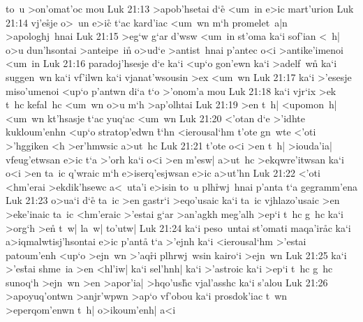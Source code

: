 to~u
>on'omat'oc
mou\bibvsend
\vs Luk 21:13
>apob'hsetai
d`e\r{}
<um~in
e>ic
mart'urion\bibvsend
\vs Luk 21:14
vj'e\r{s}je
o>~un
e>ic\r{}
t`ac
kard'iac
<um~wn
m`h
promelet~a|n
>apologhj~hnai\bibvsend
\vs Luk 21:15
>eg`w
g`ar
d'wsw
<um~in
st'oma
ka`i
sof'ian
<~h|
o>u
dun'hsontai
>anteipe~in\r{}
o>ud`e
>antist~hnai
p'antec
o<i
>antike'imenoi
<um~in\bibvsend
\vs Luk 21:16
paradoj'hsesje
d`e
ka`i
<up`o
gon'ewn
ka`i
>adelf~wn\r{}
ka`i
suggen~wn
ka`i
vf'ilwn
ka`i
vjanat'wsousin
>ex
<um~wn\bibvsend
\vs Luk 21:17
ka`i
>'esesje
miso'umenoi
<up`o
p'antwn
di`a
t`o
>'onom'a
mou\bibvsend
\vs Luk 21:18
ka`i
vjr`ix
>ek
t~hc
kefal~hc
<um~wn
o>u
m`h
>ap'olhtai\bibvsend
\vs Luk 21:19
>en
t~h|
<upomon~h|
<um~wn
kt'hsasje
t`ac
yuq`ac
<um~wn\bibvsend
\vs Luk 21:20
<'otan
d`e
>'idhte
kukloum'enhn
<up`o
stratop'edwn
\r{t}`hn
<ierousal`hm
t'ote
gn~wte
<'oti
>'hggiken
<h
>er'hmwsic
a>ut~hc\bibvsend
\vs Luk 21:21
t'ote
o<i
>en
t~h|
>iouda'ia|
vfeug'etwsan
e>ic
t`a
>'orh
ka`i
o<i
>en
m'esw|
a>ut~hc
>ekqwre'itwsan
ka`i
o<i
>en
ta~ic
q'wraic
m`h
e>iserq'esjwsan
e>ic
a>ut'hn\bibvsend
\vs Luk 21:22
<'oti
<hm'erai
>ekdik'hsewc
a<~uta'i
e>isin
to~u
plh\r{r}wj~hnai
p'anta
t`a
gegramm'ena\bibvsend
\vs Luk 21:23
o>ua`i
d`e\r{}
ta~ic
>en
gastr`i
>eqo'usaic
ka`i
ta~ic
vjhlazo'usaic
>en
>eke'inaic
ta~ic
<hm'eraic
>'estai
g`ar
>an'agkh
meg'alh
>ep`i
t~hc
g~hc
ka`i
>org`h
>e\r{n}
t~w|
la~w|
to'utw|\bibvsend
\vs Luk 21:24
ka`i
peso~untai
st'omati
maqa'ir\r{a}c
ka`i
a>iqmalwtisj'hsontai
e>ic
p'anta\r{}
t`a
>'ejnh
ka`i
<ierousal`hm
>'estai
patoum'enh
<up`o
>ejn~wn
>'aq\r{r}i
plhrwj~wsin
kairo`i
>ejn~wn\bibvsend
\vs Luk 21:25
ka`i
>'es\r{t}ai
shme~ia
>en
<hl'iw|
ka`i
sel'hnh|
ka`i
>'astroic
ka`i
>ep`i
t~hc
g~hc
sunoq`h
>ejn~wn
>en
>apor'ia|
>hqo'us\r{h}c
vjal'asshc
ka`i
s'alou\bibvsend
\vs Luk 21:26
>apoyuq'ontwn
>anjr'wpwn
>ap`o
vf'obou
ka`i
prosdok'iac
t~wn
>eperqom'enwn
t~h|
o>ikoum'enh|
a<i
